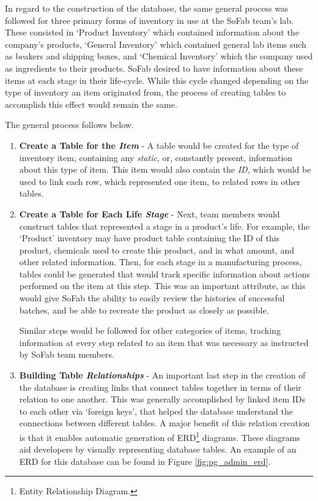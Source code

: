 \documentclass{article}
\begin{document}
In regard to the construction of the database, the same general process was followed for three primary forms of inventory in use 
at the SoFab team's lab. These consisted in `Product Inventory' which contained information about the company's products, 
`General Inventory' which contained general lab items such as beakers and shipping boxes, and `Chemical Inventory' which the 
company used as ingredients to their products. SoFab desired to have information about these items at each stage in their life-cycle. 
While this cycle changed depending on the type of inventory an item originated from, the process of creating tables to accomplish this
effect would remain the same. 

The general process follows below.
\begin{enumerate}
    \item \textbf{Create a Table for the \textit{Item}} - A table would be created for the type of inventory item, containing any 
        \textit{static}, or, constantly present, information about this type of item. This item would also contain the \textit{ID}, 
        which would be used to link each row, which represented one item, to related rows in other tables. 
    \item \textbf{Create a Table for Each Life \textit{Stage}} - Next, team members would construct tables that represented a stage in a 
        product's life. For example, the `Product' inventory may have product table containing the ID of this product, chemicals used to 
        create this product, and in what amount, and other related information. Then, for each stage in a manufacturing process, 
        tables could be generated that would track specific information about actions performed on the item at this step. This was an
        important attribute, as this would give SoFab the ability to easily review the histories of successful batches, and be able to 
        recreate the product as closely as possible. 

        Similar steps would be followed for other categories of items, tracking information at every step related to an item that was 
        necessary as instructed by SoFab team members. 
    \item \textbf{Building Table \textit{Relationships}} - An important last step in the creation of the database is creating links 
        that connect tables together in terms of their relation to one another. This was generally accomplished by linked item IDs to 
        each other via `foreign keys', that helped the database understand the connections between different tables. A major benefit of 
        this relation creation is that it enables automatic generation of ERD\footnote{Entity Relationship Diagram.} diagrams. These 
        diagrams aid developers by visually representing database tables. An example of an ERD for this database can be found in 
        Figure \ref{fig:pg_admin_erd}.
\end{enumerate}
\end{document}

